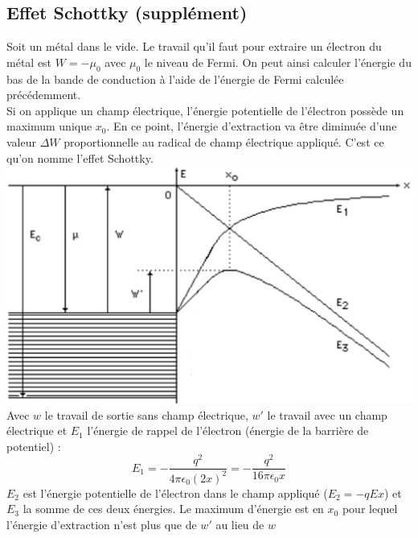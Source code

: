 \subsection{Effet Schottky (supplément)}
Soit un métal dans le vide. Le travail qu'il faut pour extraire un électron du métal est $W=-\mu_0$ avec $\mu_0$ le niveau de Fermi. On peut ainsi calculer l'énergie du bas de la bande de conduction à l'aide de l'énergie de Fermi calculée précédemment. \\
Si on applique un champ électrique, l'énergie potentielle de l'électron possède un maximum unique $x_0$. En ce point, l'énergie d'extraction va être diminuée d'une valeur $\Delta W$ proportionnelle au radical de champ électrique appliqué. C'est ce qu'on nomme l'effet Schottky.\\
\includegraphics[scale=0.4]{schottky.eps}\\
Avec $w$ le travail de sortie sans champ électrique, $w'$ le travail avec un champ électrique et $E_1$ l'énergie de rappel de l'électron (énergie de la barrière de potentiel) :
\begin{equation}
E_1=-\frac{q^2}{4\pi\epsilon_0 (2x)^2}=-\frac{q^2}{16\pi\epsilon_0 x}
\end{equation}
$E_2$ est l'énergie potentielle de l'électron dans le champ appliqué ($E_2=-qEx$) et $E_3$ la somme de ces deux énergies. Le maximum d'énergie est en $x_0$ pour lequel l'énergie d'extraction n'est plus que de $w'$ au lieu de $w$ 
